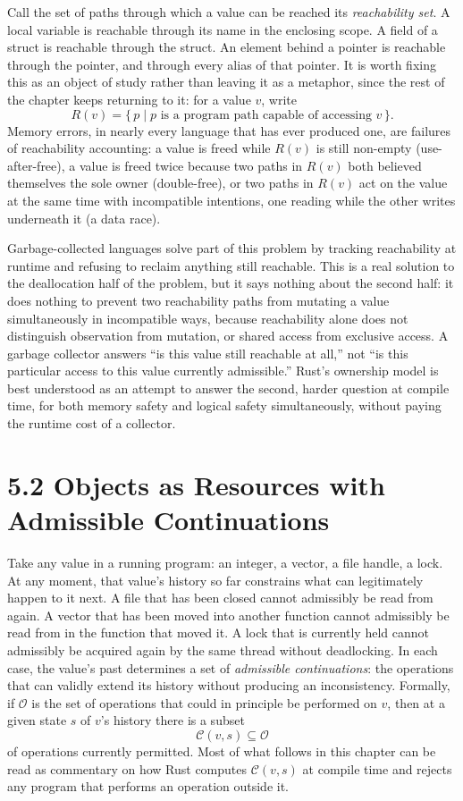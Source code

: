 \documentclass[11pt]{book}
\begin{document}
Call the set of paths through which a value can be reached its \emph{reachability set}. A local variable is reachable through its name in the enclosing scope. A field of a struct is reachable through the struct. An element behind a pointer is reachable through the pointer, and through every alias of that pointer. It is worth fixing this as an object of study rather than leaving it as a metaphor, since the rest of the chapter keeps returning to it: for a value $v$, write
\[
R(v) = \{\, p \mid p \text{ is a program path capable of accessing } v \,\}.
\]
Memory errors, in nearly every language that has ever produced one, are failures of reachability accounting: a value is freed while $R(v)$ is still non-empty (use-after-free), a value is freed twice because two paths in $R(v)$ both believed themselves the sole owner (double-free), or two paths in $R(v)$ act on the value at the same time with incompatible intentions, one reading while the other writes underneath it (a data race).

Garbage-collected languages solve part of this problem by tracking reachability at runtime and refusing to reclaim anything still reachable. This is a real solution to the deallocation half of the problem, but it says nothing about the second half: it does nothing to prevent two reachability paths from mutating a value simultaneously in incompatible ways, because reachability alone does not distinguish observation from mutation, or shared access from exclusive access. A garbage collector answers ``is this value still reachable at all,'' not ``is this particular access to this value currently admissible.'' Rust's ownership model is best understood as an attempt to answer the second, harder question at compile time, for both memory safety and logical safety simultaneously, without paying the runtime cost of a collector.

\section*{5.2 Objects as Resources with Admissible Continuations}

Take any value in a running program: an integer, a vector, a file handle, a lock. At any moment, that value's history so far constrains what can legitimately happen to it next. A file that has been closed cannot admissibly be read from again. A vector that has been moved into another function cannot admissibly be read from in the function that moved it. A lock that is currently held cannot admissibly be acquired again by the same thread without deadlocking. In each case, the value's past determines a set of \emph{admissible continuations}: the operations that can validly extend its history without producing an inconsistency. Formally, if $\mathcal{O}$ is the set of operations that could in principle be performed on $v$, then at a given state $s$ of $v$'s history there is a subset
\[
\mathcal{C}(v, s) \subseteq \mathcal{O}
\]
of operations currently permitted. Most of what follows in this chapter can be read as commentary on how Rust computes $\mathcal{C}(v, s)$ at compile time and rejects any program that performs an operation outside it.
\end{document}
